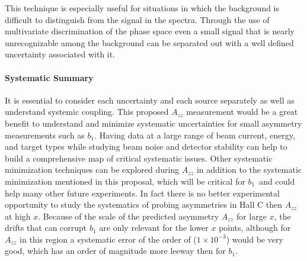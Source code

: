 This technique is especially useful for situations in which the background
is difficult to distinguish from the signal in the spectra.  Through the use of multivariate
discrimination of the phase space even a small signal that is nearly
unrecognizable among the background can be separated out with a well defined
uncertainty associated with it.
\fi

\paragraph{Systematic Summary }\mbox{}


It is essential to consider each uncertainty and each source separately as well as understand systemic coupling.  
This proposed $A_{zz}$ measurement would be a great benefit to understand and minimize systematic uncertainties for small asymmetry measurements such as $b_1$. Having data at a large range of beam
current, energy, and target types while studying beam noise and detector stability can help to build a comprehensive map of critical systematic issues. Other systematic minimization techniques can be explored during $A_{zz}$ in addition to the systematic minimization mentioned in this proposal, which will be critical for $b_1$~\need and could help many other future experiments. In fact there is no better experimental opportunity to study the systematics of probing asymmetries in Hall C then $A_{zz}$ at high $x$. Because of the scale of the predicted asymmetry $A_{zz}$ for large $x$, the drifts that can corrupt
$b_1$ are only relevant for the lower $x$ points, although for $A_{zz}$ in this region a systematic error of the order of ($1\times10^{-3}$) would be very good, which has an order of magnitude more leeway
then for $b_1$. 

